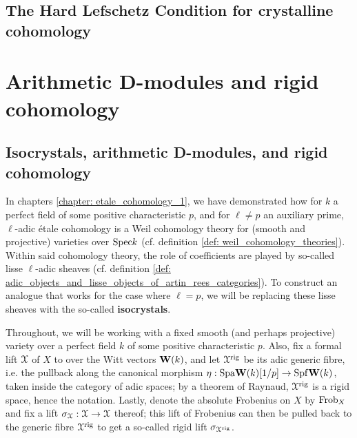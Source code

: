         \subsection{The Hard Lefschetz Condition for crystalline cohomology}
        
    \section{Arithmetic D-modules and rigid cohomology}
        \subsection{Isocrystals, arithmetic D-modules, and rigid cohomology}
            In chapters \ref{chapter: etale_cohomology_1}, we have demonstrated how for $k$ a perfect field of some positive characteristic $p$, and for $\ell \not = p$ an auxiliary prime, $\ell$-adic \'etale cohomology is a Weil cohomology theory for (smooth and projective) varieties over $\mathrm{Spec} k$ (cf. definition \ref{def: weil_cohomology_theories}). Within said cohomology theory, the role of coefficients are played by so-called lisse $\ell$-adic sheaves (cf. definition \ref{def: adic_objects_and_lisse_objects_of_artin_rees_categories}). To construct an analogue that works for the case where $\ell = p$, we will be replacing these lisse sheaves with the so-called \textbf{isocrystals}.
            
            \begin{convention}
                Throughout, we will be working with a fixed smooth (and perhaps projective) variety over a perfect field $k$ of some positive characteristic $p$. Also, fix a formal lift $\mathcal{X}$ of $X$ to over the Witt vectors $\mathbf{W}(k)$, and let $\mathcal{X}^{\mathrm{rig}}$ be its adic generic fibre, i.e. the pullback along the canonical morphism $\eta: \mathrm{Spa}\mathbf{W}(k)[1/p] \to \mathrm{Spf}\mathbf{W}(k)$, taken inside the category of adic spaces; by a theorem of Raynaud, $\mathcal{X}^{\mathrm{rig}}$ is a rigid space, hence the notation. Lastly, denote the absolute Frobenius on $X$ by $\mathrm{Frob}_X$ and fix a lift $\sigma_{\mathcal{X}}: \mathcal{X} \to \mathcal{X}$ thereof; this lift of Frobenius can then be pulled back to the generic fibre $\mathcal{X}^{\mathrm{rig}}$ to get a so-called rigid lift $\sigma_{\mathcal{X}^{\mathrm{rig}}}$.
            \end{convention}
            

